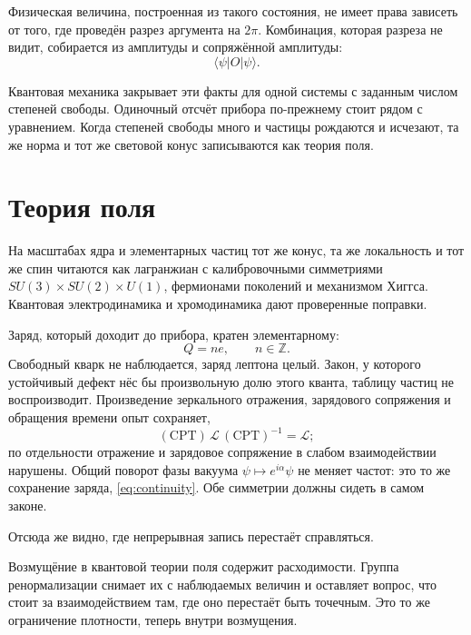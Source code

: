 Физическая величина, построенная из такого состояния,
не имеет права зависеть от того, где проведён разрез аргумента на $2\pi$.
Комбинация, которая разреза не видит, собирается из амплитуды и сопряжённой амплитуды:
\begin{equation}
  \langle\psi|O|\psi\rangle.
  \label{eq:observable}
\end{equation}

Квантовая механика закрывает эти факты для одной системы с заданным числом степеней свободы.
Одиночный отсчёт прибора по-прежнему стоит рядом с уравнением.
Когда степеней свободы много и частицы рождаются и исчезают,
та же норма и тот же световой конус записываются как теория поля.

\section{Теория поля}
\label{sec:qft-open}

На масштабах ядра и элементарных частиц тот же конус, та же локальность и тот же спин
читаются как лагранжиан с калибровочными симметриями $SU(3)\times SU(2)\times U(1)$,
фермионами поколений и механизмом Хиггса.
Квантовая электродинамика и хромодинамика дают проверенные поправки.

Заряд, который доходит до прибора, кратен элементарному:
\begin{equation}
  Q = n e, \qquad n\in\mathbb{Z}.
  \label{eq:charge-quantum}
\end{equation}
Свободный кварк не наблюдается, заряд лептона целый.
Закон, у которого устойчивый дефект нёс бы произвольную долю этого кванта,
таблицу частиц не воспроизводит.
Произведение зеркального отражения, зарядового сопряжения и обращения времени опыт сохраняет,
\begin{equation}
  (\mathrm{CPT})\,\mathcal{L}\,(\mathrm{CPT})^{-1} = \mathcal{L};
  \label{eq:cpt}
\end{equation}
по отдельности отражение и зарядовое сопряжение в слабом взаимодействии нарушены.
Общий поворот фазы вакуума $\psi\mapsto e^{i\alpha}\psi$ не меняет частот:
это то же сохранение заряда, \eqref{eq:continuity}.
Обе симметрии должны сидеть в самом законе.

Отсюда же видно, где непрерывная запись перестаёт справляться.

Возмущёние в квантовой теории поля содержит расходимости.
Группа ренормализации снимает их с наблюдаемых величин
и оставляет вопрос, что стоит за взаимодействием там,
где оно перестаёт быть точечным.
Это то же ограничение плотности, теперь внутри возмущения.

